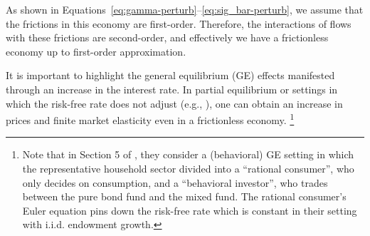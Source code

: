 As shown in Equations~\eqref{eq:gamma-perturb}--\eqref{eq:sig_bar-perturb}, we assume that the frictions in this economy are first-order. Therefore, the interactions of flows with these frictions are second-order, and effectively we have a frictionless economy up to first-order approximation.

It is important to highlight the general equilibrium (GE) effects manifested through an increase in the interest rate. In partial equilibrium or settings in which the risk-free rate does not adjust (e.g., \citealp{gabaix2020search}), one can obtain an increase in prices and finite market elasticity even in a frictionless economy.%
\footnote{Note that in Section 5 of \cite{gabaix2020search}, they consider a (behavioral) GE setting in which the representative household sector divided into a ``rational consumer'', who only decides on consumption, and a ``behavioral investor'', who trades between the pure bond fund and the mixed fund. The rational consumer's Euler equation pins down the risk-free rate which is constant in their setting with i.i.d. endowment growth.}




